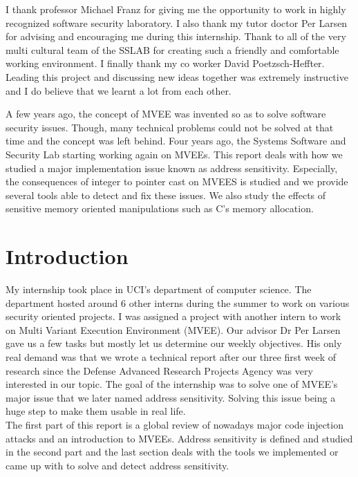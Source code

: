 \documentclass[english]{enstaPRE}
\begin{document}
\couverture






I thank professor Michael Franz for giving me the opportunity to work in highly recognized software security laboratory.
I also thank my tutor doctor Per Larsen for advising and encouraging me during this internship.
Thank to all of the very multi cultural team of the SSLAB for creating such a friendly and comfortable working environment.
I finally thank my co worker David Poetzsch-Heffter. Leading this project and discussing new ideas together was extremely 
instructive and I do believe that we learnt a lot from each other.


A few years ago, the concept of MVEE was invented so as to solve software security issues. 
Though, many technical problems could not be solved at that time and the concept was left behind.
Four years ago, the Systems Software and Security Lab starting working again on MVEEs.
This report deals with how we studied a major implementation issue known as address sensitivity.
Especially, the consequences of integer to pointer cast on MVEES is studied and we provide several tools able to detect and fix 
these issues. We also study the effects of sensitive memory oriented manipulations such as C's memory allocation.
\tableofcontents

\part{Introduction}

My internship took place in UCI's department of computer science. The department hosted around 6 other interns during the summer to 
work on various security oriented projects. I was assigned a project with another intern to work on Multi Variant Execution 
Environment (MVEE). Our advisor Dr Per Larsen gave us a few tasks but mostly let us determine our weekly objectives.
His only real demand was that we wrote a technical report after our three first week of research since the Defense Advanced
Research Projects Agency was very interested in our topic.
The goal of the internship was to solve one of MVEE's major issue that we later named address sensitivity. Solving this issue being
a huge step to make them usable in real life. \\
The first part of this report is a global review of nowadays major code injection attacks and an introduction to MVEEs.
Address sensitivity is defined and studied in the second part and the last section deals with the tools we implemented 
or came up with to solve and detect address sensitivity.
\end{document}
